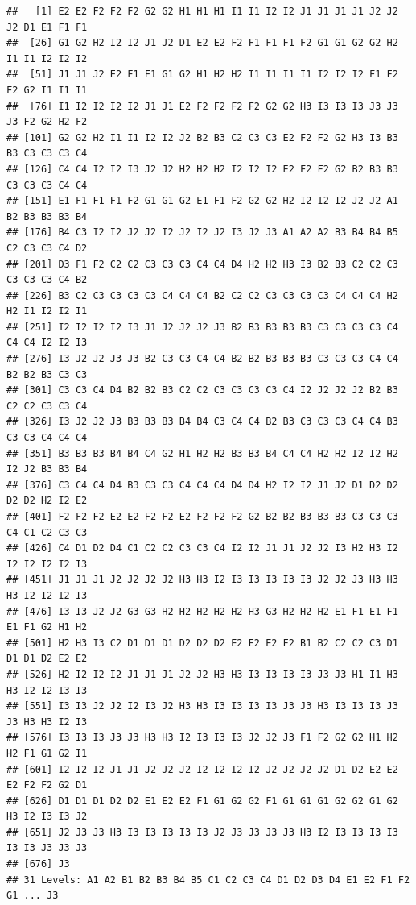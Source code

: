 \documentclass[
  spanish,
]{book}
\newenvironment{Shaded}{\begin{snugshade}}{\end{snugshade}}
\newcommand{\AttributeTok}[1]{\textcolor[rgb]{0.77,0.63,0.00}{#1}}
\newcommand{\ConstantTok}[1]{\textcolor[rgb]{0.00,0.00,0.00}{#1}}
\newcommand{\FunctionTok}[1]{\textcolor[rgb]{0.00,0.00,0.00}{#1}}
\newcommand{\NormalTok}[1]{#1}
\newcommand{\SpecialCharTok}[1]{\textcolor[rgb]{0.00,0.00,0.00}{#1}}
\newcommand{\StringTok}[1]{\textcolor[rgb]{0.31,0.60,0.02}{#1}}
\theoremstyle{break}
\begin{document}
\begin{verbatim}
##   [1] E2 E2 F2 F2 F2 G2 G2 H1 H1 H1 I1 I1 I2 I2 J1 J1 J1 J1 J2 J2 J2 D1 E1 F1 F1
##  [26] G1 G2 H2 I2 I2 J1 J2 D1 E2 E2 F2 F1 F1 F1 F2 G1 G1 G2 G2 H2 I1 I1 I2 I2 I2
##  [51] J1 J1 J2 E2 F1 F1 G1 G2 H1 H2 H2 I1 I1 I1 I1 I2 I2 I2 F1 F2 F2 G2 I1 I1 I1
##  [76] I1 I2 I2 I2 I2 J1 J1 E2 F2 F2 F2 F2 G2 G2 H3 I3 I3 I3 J3 J3 J3 F2 G2 H2 F2
## [101] G2 G2 H2 I1 I1 I2 I2 J2 B2 B3 C2 C3 C3 E2 F2 F2 G2 H3 I3 B3 B3 C3 C3 C3 C4
## [126] C4 C4 I2 I2 I3 J2 J2 H2 H2 H2 I2 I2 I2 E2 F2 F2 G2 B2 B3 B3 C3 C3 C3 C4 C4
## [151] E1 F1 F1 F1 F2 G1 G1 G2 E1 F1 F2 G2 G2 H2 I2 I2 I2 J2 J2 A1 B2 B3 B3 B3 B4
## [176] B4 C3 I2 I2 J2 J2 I2 J2 I2 J2 I3 J2 J3 A1 A2 A2 B3 B4 B4 B5 C2 C3 C3 C4 D2
## [201] D3 F1 F2 C2 C2 C3 C3 C3 C4 C4 D4 H2 H2 H3 I3 B2 B3 C2 C2 C3 C3 C3 C3 C4 B2
## [226] B3 C2 C3 C3 C3 C3 C4 C4 C4 B2 C2 C2 C3 C3 C3 C3 C4 C4 C4 H2 H2 I1 I2 I2 I1
## [251] I2 I2 I2 I2 I3 J1 J2 J2 J2 J3 B2 B3 B3 B3 B3 C3 C3 C3 C3 C4 C4 C4 I2 I2 I3
## [276] I3 J2 J2 J3 J3 B2 C3 C3 C4 C4 B2 B2 B3 B3 B3 C3 C3 C3 C4 C4 B2 B2 B3 C3 C3
## [301] C3 C3 C4 D4 B2 B2 B3 C2 C2 C3 C3 C3 C3 C4 I2 J2 J2 J2 B2 B3 C2 C2 C3 C3 C4
## [326] I3 J2 J2 J3 B3 B3 B3 B4 B4 C3 C4 C4 B2 B3 C3 C3 C3 C4 C4 B3 C3 C3 C4 C4 C4
## [351] B3 B3 B3 B4 B4 C4 G2 H1 H2 H2 B3 B3 B4 C4 C4 H2 H2 I2 I2 H2 I2 J2 B3 B3 B4
## [376] C3 C4 C4 D4 B3 C3 C3 C4 C4 C4 D4 D4 H2 I2 I2 J1 J2 D1 D2 D2 D2 D2 H2 I2 E2
## [401] F2 F2 F2 E2 E2 F2 F2 E2 F2 F2 F2 G2 B2 B2 B3 B3 B3 C3 C3 C3 C4 C1 C2 C3 C3
## [426] C4 D1 D2 D4 C1 C2 C2 C3 C3 C4 I2 I2 J1 J1 J2 J2 I3 H2 H3 I2 I2 I2 I2 I2 I3
## [451] J1 J1 J1 J2 J2 J2 J2 H3 H3 I2 I3 I3 I3 I3 I3 J2 J2 J3 H3 H3 H3 I2 I2 I2 I3
## [476] I3 I3 J2 J2 G3 G3 H2 H2 H2 H2 H2 H3 G3 H2 H2 H2 E1 F1 E1 F1 E1 F1 G2 H1 H2
## [501] H2 H3 I3 C2 D1 D1 D1 D2 D2 D2 E2 E2 E2 F2 B1 B2 C2 C2 C3 D1 D1 D1 D2 E2 E2
## [526] H2 I2 I2 I2 J1 J1 J1 J2 J2 H3 H3 I3 I3 I3 I3 J3 J3 H1 I1 H3 H3 I2 I2 I3 I3
## [551] I3 I3 J2 J2 I2 I3 J2 H3 H3 I3 I3 I3 I3 J3 J3 H3 I3 I3 I3 J3 J3 H3 H3 I2 I3
## [576] I3 I3 I3 J3 J3 H3 H3 I2 I3 I3 I3 J2 J2 J3 F1 F2 G2 G2 H1 H2 H2 F1 G1 G2 I1
## [601] I2 I2 I2 J1 J1 J2 J2 J2 I2 I2 I2 I2 J2 J2 J2 J2 D1 D2 E2 E2 E2 F2 F2 G2 D1
## [626] D1 D1 D1 D2 D2 E1 E2 E2 F1 G1 G2 G2 F1 G1 G1 G1 G2 G2 G1 G2 H3 I2 I3 I3 J2
## [651] J2 J3 J3 H3 I3 I3 I3 I3 I3 J2 J3 J3 J3 J3 H3 I2 I3 I3 I3 I3 I3 I3 J3 J3 J3
## [676] J3
## 31 Levels: A1 A2 B1 B2 B3 B4 B5 C1 C2 C3 C4 D1 D2 D3 D4 E1 E2 F1 F2 G1 ... J3
\end{verbatim}

\begin{Shaded}
\end{Shaded}
\end{document}
